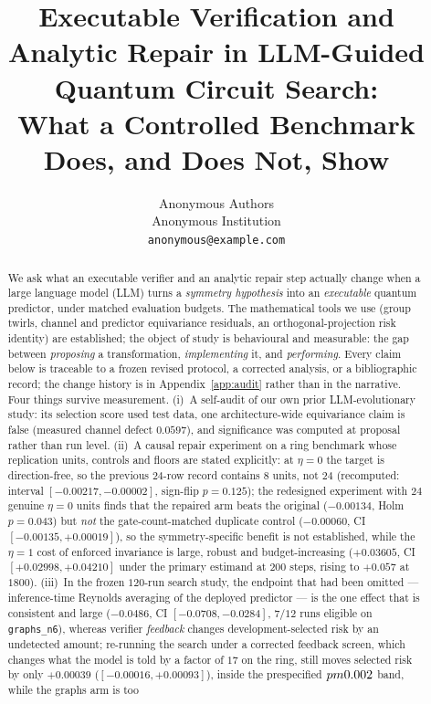 \documentclass{neurips_2024}
\title{Executable Verification and Analytic Repair in LLM-Guided Quantum Circuit
Search:\\ What a Controlled Benchmark Does, and Does Not, Show}
\author{Anonymous Authors\\
Anonymous Institution\\
\texttt{anonymous@example.com}}
\begin{document}
\maketitle

\begin{abstract}
We ask what an executable verifier and an analytic repair step actually change when a
large language model (LLM) turns a \emph{symmetry hypothesis} into an \emph{executable}
quantum predictor, under matched evaluation budgets. The mathematical tools we use
(group twirls, channel and predictor equivariance residuals, an orthogonal-projection
risk identity) are established; the object of study is behavioural and measurable: the
gap between \emph{proposing} a transformation, \emph{implementing} it, and
\emph{performing}. Every claim below is traceable to a frozen revised protocol, a corrected
analysis, or a bibliographic record; the change history is in Appendix~\ref{app:audit} rather
than in the narrative. Four things survive measurement. (i)~A self-audit of our own prior
LLM-evolutionary study: its selection score used test data, one architecture-wide
equivariance claim is false (measured channel defect $0.0597$), and significance was
computed at proposal rather than run level. (ii)~A causal repair experiment on a ring
benchmark whose replication units, controls and floors are stated explicitly: at
$\eta{=}0$ the target is direction-free, so the previous $24$-row record contains $8$ units,
not $24$ (recomputed: interval $[-0.00217,-0.00002]$, sign-flip $p{=}0.125$); the redesigned
experiment with $24$ genuine $\eta{=}0$ units finds that the repaired arm beats the original
($-0.00134$, Holm $p{=}0.043$) but \emph{not} the gate-count-matched duplicate control
($-0.00060$, CI $[-0.00135,+0.00019]$), so the symmetry-specific benefit is not established,
while the $\eta{=}1$ cost of enforced invariance is large, robust and budget-increasing
($+0.03605$, CI $[+0.02998,+0.04210]$ under the primary estimand at $200$ steps, rising to
$+0.057$ at $1800$). (iii)~In the frozen $120$-run search study,
the endpoint that had been omitted --- inference-time Reynolds averaging of the deployed
predictor --- is the one effect that is consistent and large
($-0.0486$, CI $[-0.0708,-0.0284]$, $7/12$ runs eligible on \texttt{graphs\_n6}), whereas
verifier \emph{feedback} changes development-selected risk by an undetected amount; re-running
the search under a corrected feedback screen, which changes what the model is told by a factor of
$17$ on the ring, still moves selected risk by only $+0.00039$
($[-0.00016,+0.00093]$), inside the prespecified $\\pm0.002$ band, while the graphs arm is too

\end{abstract}
\end{document}
